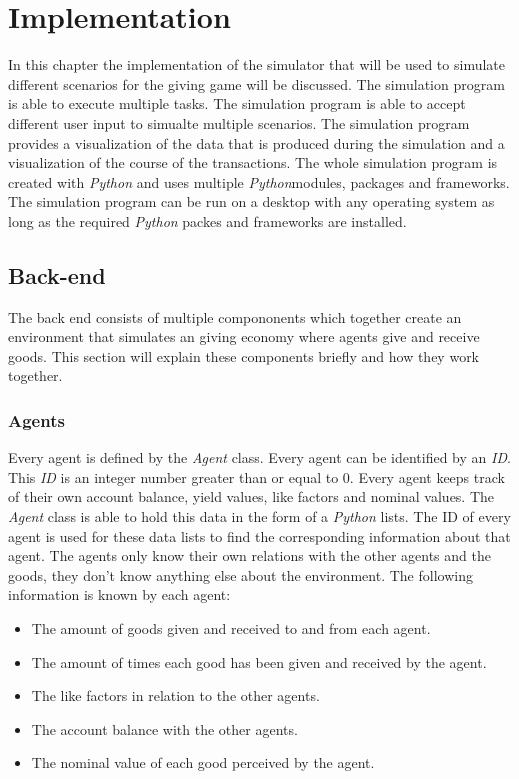 \documentclass[twoside,openright]{uva-bachelor-thesis}
\begin{document}
\chapter{Implementation}
In this chapter the implementation of the simulator that will be used to simulate different scenarios for the giving game will be discussed. The simulation program is able to execute multiple tasks. The simulation program is able to accept different user input to simualte multiple scenarios. The simulation program provides a visualization of the data that is produced during the simulation and a visualization of the course of the transactions. The whole simulation program is created with \textit{Python} and uses multiple \textit{Python}modules,  packages and frameworks. The simulation program can be run on a desktop with any operating system as long as the required \textit{Python} packes and frameworks are installed. 

\section{Back-end}
The back end consists of multiple compononents which together create an environment that simulates an giving economy where agents give and receive goods. This section will explain these components briefly and how they work together. 

\subsection{Agents}
Every agent is defined by the \textit{Agent} class. Every agent can be identified by an \textit{ID}. This \textit{ID} is an integer number greater than or equal to 0. Every agent keeps track of their own account balance, yield values, like factors and nominal values. The \textit{Agent} class is able to hold this data in the form of a \textit{Python} lists. The ID of every agent is used for these data lists to find the corresponding information about that agent. The agents only know their own relations with the other agents and the goods, they don't know anything else about the environment. The following information is known by each agent:
\begin{itemize}
\item The amount of goods given and received to and from each agent.
\item The amount of times each good has been given and received by the agent.
\item The like factors in relation to the other agents.
\item The account balance with the other agents.
\item The nominal value of each good perceived by the agent.
\end{itemize}
\end{document}

